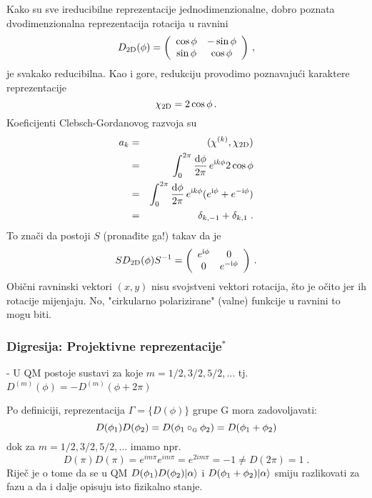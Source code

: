 Kako su sve ireducibilne reprezentacije jednodimenzionalne,
dobro poznata dvodimenzionalna reprezentacija rotacija u ravnini
\begin{equation}        
 D_{\rm 2D} (\phi) = \left( 
\begin{array}{cc}        
\cos\phi & -\sin\phi \\
\sin\phi & \cos\phi
\end{array}                
\right) \,, 
\end{equation}
je svakako reducibilna. Kao i gore, redukciju provodimo
poznavajući karaktere reprezentacije
\begin{equation}
    \chi_{\rm 2D}=2\cos\phi \,.
\end{equation}
Koeficijenti Clebsch-Gordanovog razvoja su
\begin{eqnarray*}
a_k & = & (\chi^{(k)}, \chi_{\rm 2D}) \\
    & = & \int_{0}^{2\pi}\frac{\textrm{d} \phi}{2\pi}\,
   e^{\textrm{\scriptsize i} k \phi} 2\cos\phi  \\
 & = & \int_{0}^{2\pi}\frac{\textrm{d} \phi}{2\pi}\,
  e^{\textrm{\scriptsize i} k \phi} ( e^{\textrm{\scriptsize i}  \phi} + e^{-\textrm{\scriptsize i}  \phi}) \\
 & = & \delta_{k,-1} + \delta_{k, 1} \;.
\end{eqnarray*}
To znači da postoji $S$ (pronađite ga!) takav da je
\begin{equation}
  S D_{\rm 2D} (\phi) S^{-1} = \left(
\begin{array}{cc}        
e^{\textrm{\scriptsize i}  \phi} &  0 \\
0 & e^{- \textrm{\scriptsize i}  \phi}
\end{array}                
\right) \,.
\end{equation}
Obični ravninski vektori $(x, y)$ nisu svojstveni vektori
rotacija, što je očito jer ih rotacije mijenjaju. No, "cirkularno
polarizirane" (valne) funkcije u ravnini to mogu biti.

\subsubsection*{Digresija: Projektivne reprezentacije$^*$}

- U QM postoje sustavi za koje $m = 1/2, 3/2, 5/2, \ldots$ tj.
  $D^{(m)}(\phi)=-D^{(m)}(\phi + 2\pi)$


Po definiciji, reprezentacija $\Gamma=\{D(\phi)\}$ grupe G mora zadovoljavati:
\begin{displaymath}
    D(\phi_1)D(\phi_2)=D(\phi_1\circ_{\textrm{\tiny G}}\phi_2)
        =D(\phi_1 + \phi_2)
\end{displaymath}
dok za $m = 1/2, 3/2, 5/2, \ldots$ imamo npr.
\begin{displaymath}
 D(\pi) D(\pi) = e^{i m \pi}e^{i m \pi} = e^{2 i m \pi}=-1
\neq D(2\pi)=1 \;.
\end{displaymath}
Riječ je o tome da se u QM $D(\phi_1)D(\phi_2)| \alpha \rangle$ i
$D(\phi_1 + \phi_2)| \alpha \rangle$ smiju razlikovati za fazu
a da i dalje opisuju isto fizikalno stanje.

